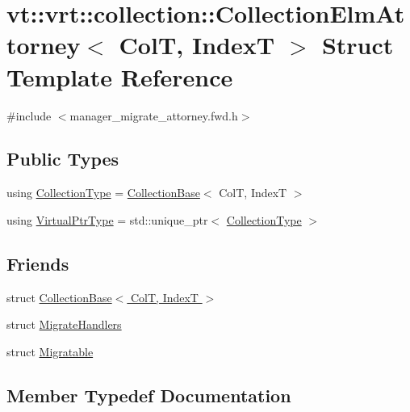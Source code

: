 \hypertarget{structvt_1_1vrt_1_1collection_1_1_collection_elm_attorney}{}\section{vt\+:\+:vrt\+:\+:collection\+:\+:Collection\+Elm\+Attorney$<$ ColT, IndexT $>$ Struct Template Reference}
\label{structvt_1_1vrt_1_1collection_1_1_collection_elm_attorney}


{\ttfamily \#include $<$manager\+\_\+migrate\+\_\+attorney.\+fwd.\+h$>$}

\subsection*{Public Types}
\begin{DoxyCompactItemize}
\item 
using \hyperlink{structvt_1_1vrt_1_1collection_1_1_collection_elm_attorney_a72d0076f73ac093f85ba5910337c6d02}{Collection\+Type} = \hyperlink{structvt_1_1vrt_1_1collection_1_1_collection_base}{Collection\+Base}$<$ ColT, IndexT $>$
\item 
using \hyperlink{structvt_1_1vrt_1_1collection_1_1_collection_elm_attorney_a36fe2c7f590baec1038c592db59a6315}{Virtual\+Ptr\+Type} = std\+::unique\+\_\+ptr$<$ \hyperlink{structvt_1_1vrt_1_1collection_1_1_collection_elm_attorney_a72d0076f73ac093f85ba5910337c6d02}{Collection\+Type} $>$
\end{DoxyCompactItemize}
\subsection*{Friends}
\begin{DoxyCompactItemize}
\item 
struct \hyperlink{structvt_1_1vrt_1_1collection_1_1_collection_elm_attorney_a4fb39ed9be2f0de84b237088ececde3f}{Collection\+Base$<$ Col\+T, Index\+T $>$}
\item 
struct \hyperlink{structvt_1_1vrt_1_1collection_1_1_collection_elm_attorney_af2ee449d95081faa04ebc6b8ae6516ed}{Migrate\+Handlers}
\item 
struct \hyperlink{structvt_1_1vrt_1_1collection_1_1_collection_elm_attorney_a5137563a7cb738979426be13c3089839}{Migratable}
\end{DoxyCompactItemize}


\subsection{Member Typedef Documentation}
\mbox{\label{structvt_1_1vrt_1_1collection_1_1_collection_elm_attorney_a72d0076f73ac093f85ba5910337c6d02}} 
